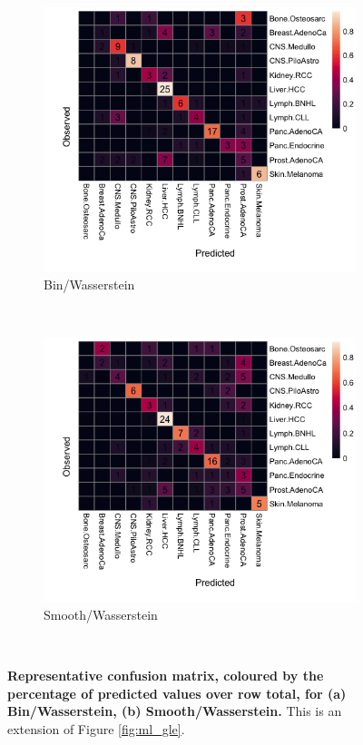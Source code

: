 \begin{figure}[ht!]
    \begin{subfigure}{.5\textwidth}
    \centering
    \includegraphics[width=\textwidth,height=0.9\textwidth]{graphics/confusion_matrix_bins_wasserstein.png}
    \caption{Bin/Wasserstein}
    \label{fig:confusion_bin_Wasserstein}
    \end{subfigure}
    ~
    \begin{subfigure}{.5\textwidth}
    \centering
    \includegraphics[width=\textwidth,height=0.9\textwidth]{graphics/confusion_matrix_smooth_wasserstein.png}
    \caption{Smooth/Wasserstein}
    \label{fig:confusion_smooth_wasserstein}
    \end{subfigure} \\
    
    \caption{\textbf{Representative confusion matrix, coloured by the percentage of predicted values over row total, for (a) Bin/Wasserstein, (b) Smooth/Wasserstein.} This is an extension of Figure \ref{fig:ml_gle}.}
    \label{fig:apdx_ml_gle}
\end{figure}